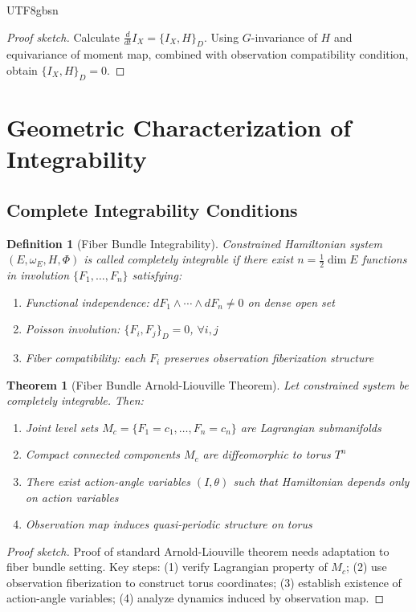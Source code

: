 \documentclass[a4paper,12pt]{extarticle}
\newtheorem{theorem}{Theorem}
\newtheorem{definition}{Definition}
\theoremstyle{definition}
\begin{document}
\begin{CJK}{UTF8}{gbsn}
\begin{proof}[Proof sketch]
Calculate $\frac{d}{dt}I_X = \{I_X, H\}_D$. Using $G$-invariance of $H$ and equivariance of moment map, combined with observation compatibility condition, obtain $\{I_X, H\}_D = 0$.
\end{proof}

\section{Geometric Characterization of Integrability}

\subsection{Complete Integrability Conditions}

\begin{definition}[Fiber Bundle Integrability]
Constrained Hamiltonian system $(E, \omega_E, H, \Phi)$ is called completely integrable if there exist $n = \frac{1}{2}\dim E$ functions in involution $\{F_1, \ldots, F_n\}$ satisfying:
\begin{enumerate}[label=(\arabic*)]
\item Functional independence: $dF_1 \wedge \cdots \wedge dF_n \neq 0$ on dense open set
\item Poisson involution: $\{F_i, F_j\}_D = 0$, $\forall i, j$
\item Fiber compatibility: each $F_i$ preserves observation fiberization structure
\end{enumerate}
\end{definition}

\begin{theorem}[Fiber Bundle Arnold-Liouville Theorem]
Let constrained system be completely integrable. Then:
\begin{enumerate}[label=(\arabic*)]
\item Joint level sets $M_c = \{F_1 = c_1, \ldots, F_n = c_n\}$ are Lagrangian submanifolds
\item Compact connected components $M_c$ are diffeomorphic to torus $T^n$
\item There exist action-angle variables $(I, \theta)$ such that Hamiltonian depends only on action variables
\item Observation map induces quasi-periodic structure on torus
\end{enumerate}
\end{theorem}

\begin{proof}[Proof sketch]
Proof of standard Arnold-Liouville theorem\cite{arnold1989mathematical} needs adaptation to fiber bundle setting. Key steps: (1) verify Lagrangian property of $M_c$; (2) use observation fiberization to construct torus coordinates; (3) establish existence of action-angle variables; (4) analyze dynamics induced by observation map.
\end{proof}


\end{CJK}
\end{document}
